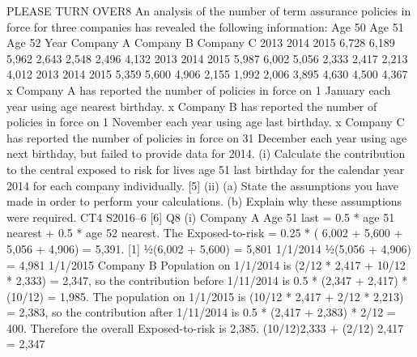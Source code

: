 PLEASE TURN OVER8
An analysis of the number of term assurance policies in force for three companies has
revealed the following information:
Age 50
Age 51
Age 52
Year Company A Company B Company C
2013
2014
2015 6,728
6,189
5,962 2,643
2,548
2,496 4,132
2013
2014
2015 5,987
6,002
5,056 2,333
2,417
2,213 4,012
2013
2014
2015 5,359
5,600
4,906 2,155
1,992
2,006 3,895
4,630
4,500
4,367
x Company A has reported the number of policies in force on 1 January each year
using age nearest birthday.
x Company B has reported the number of policies in force on 1 November each year
using age last birthday.
x Company C has reported the number of policies in force on 31 December each
year using age next birthday, but failed to provide data for 2014.
(i) Calculate the contribution to the central exposed to risk for lives age 51 last
birthday for the calendar year 2014 for each company individually.
[5]
(ii) (a)
State the assumptions you have made in order to perform
your calculations.
(b)
Explain why these assumptions were required.
CT4 S2016–6
[6]
Q8
(i)
Company A
Age 51 last = 0.5 * age 51 nearest + 0.5 * age 52 nearest. 
The Exposed-to-risk = 0.25 * ( 6,002 + 5,600 + 5,056 + 4,906) = 5,391. [1]
1⁄2(6,002 + 5,600)
= 5,801
1/1/2014
1⁄2(5,056 + 4,906)
= 4,981
1/1/2015
Company B
Population on 1/1/2014 is (2/12 * 2,417 + 10/12 * 2,333) = 2,347, 
so the contribution before 1/11/2014 is 0.5 * (2,347 + 2,417) * (10/12) = 1,985. 
The population on 1/1/2015 is (10/12 * 2,417 + 2/12 * 2,213) = 2,383, 
so the contribution after 1/11/2014 is 0.5 * (2,417 + 2,383) * 2/12 = 400. 
Therefore the overall Exposed-to-risk is 2,385.
(10/12)2,333 + (2/12) 2,417
= 2,347

